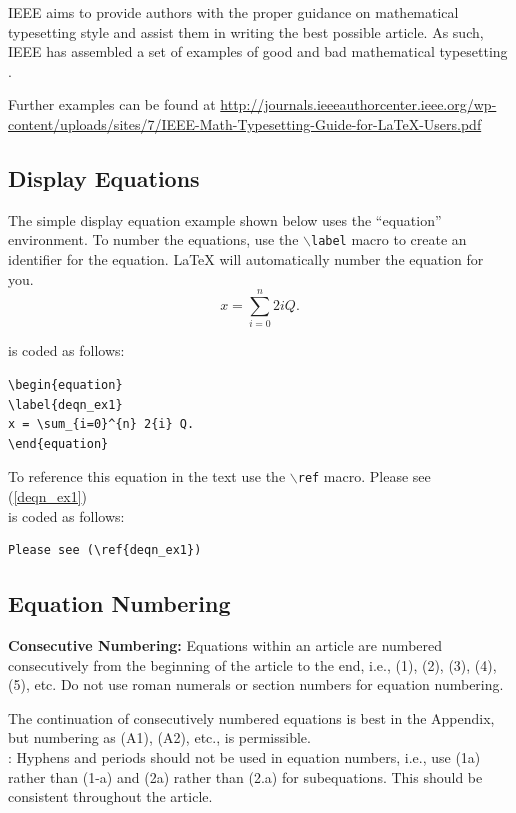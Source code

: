 IEEE aims to provide authors with the proper guidance on mathematical typesetting style and assist them in writing the best possible article. As such, IEEE has assembled a set of examples of good and bad mathematical typesetting \cite{ref1,ref2,ref3,ref4,ref5}. 

Further examples can be found at \url{http://journals.ieeeauthorcenter.ieee.org/wp-content/uploads/sites/7/IEEE-Math-Typesetting-Guide-for-LaTeX-Users.pdf}

\subsection{Display Equations}
The simple display equation example shown below uses the ``equation'' environment. To number the equations, use the $\backslash${\tt{label}} macro to create an identifier for the equation. LaTeX will automatically number the equation for you.
\begin{equation}
\label{deqn_ex1}
x = \sum_{i=0}^{n} 2{i} Q.
\end{equation}

\noindent is coded as follows:
\begin{verbatim}
\begin{equation}
\label{deqn_ex1}
x = \sum_{i=0}^{n} 2{i} Q.
\end{equation}
\end{verbatim}

To reference this equation in the text use the $\backslash${\tt{ref}} macro. 
Please see (\ref{deqn_ex1})\\
\noindent is coded as follows:
\begin{verbatim}
Please see (\ref{deqn_ex1})\end{verbatim}

\subsection{Equation Numbering}
{\bf{Consecutive Numbering:}} Equations within an article are numbered consecutively from the beginning of the
article to the end, i.e., (1), (2), (3), (4), (5), etc. Do not use roman numerals or section numbers for equation numbering.

 The continuation of consecutively numbered equations is best in the Appendix, but numbering
 as (A1), (A2), etc., is permissible.\\

: Hyphens and periods should not be used in equation numbers, i.e., use (1a) rather than
(1-a) and (2a) rather than (2.a) for subequations. This should be consistent throughout the article.

